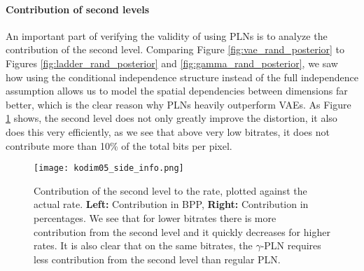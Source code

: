 \paragraph{Contribution of second levels}
An important part of verifying the validity of using PLNs is to analyze the
contribution of the second level. Comparing Figure \ref{fig:vae_rand_posterior}
to Figures \ref{fig:ladder_rand_posterior} and \ref{fig:gamma_rand_posterior},
we saw how using the conditional independence structure instead of the
full independence assumption allows us to model the spatial dependencies between
dimensions far better, which is the clear reason why PLNs heavily outperform VAEs.
As Figure \ref{fig:kodim05_side_info} shows, the second level does not only
greatly improve the distortion, it also does this very efficiently, as we see that
above very low bitrates, it does not contribute more than 10\% of the total bits
per pixel.
\begin{figure}
  \centering
  \texttt{[image: kodim05\_side\_info.png]}
  \caption[Contribution of the second level to the rate, plotted against the
    actual rate.]{Contribution of the second level to the rate, plotted against the
    actual rate. \textbf{Left:} Contribution in BPP, \textbf{Right:}
    Contribution in percentages. We see that for lower bitrates there is more
    contribution from the second level and it quickly decreases for higher
    rates. It is also clear that on the same bitrates, the $\gamma$-PLN requires
    less contribution from the second level than regular PLN.}
  \label{fig:kodim05_side_info}
\end{figure}

